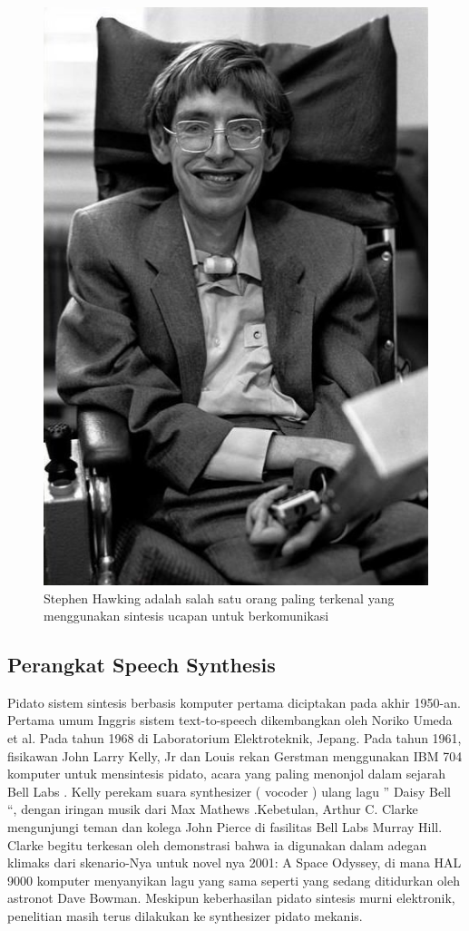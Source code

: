 \begin{figure}[H]
        \centerline{\includegraphics[scale=.45]{figures/stephan}}
        \caption{Stephen Hawking adalah salah satu orang paling terkenal yang menggunakan sintesis ucapan untuk berkomunikasi}
		\label{stephan}
\end{figure}

\subsection{Perangkat Speech Synthesis}
Pidato sistem sintesis berbasis komputer pertama diciptakan pada akhir 1950-an. Pertama umum Inggris sistem text-to-speech dikembangkan oleh Noriko Umeda et al. Pada tahun 1968 di Laboratorium Elektroteknik, Jepang. Pada tahun 1961, fisikawan John Larry Kelly, Jr dan Louis rekan Gerstman menggunakan IBM 704 komputer untuk mensintesis pidato, acara yang paling menonjol dalam sejarah Bell Labs . Kelly perekam suara synthesizer ( vocoder ) ulang lagu ” Daisy Bell “, dengan iringan musik dari Max Mathews .Kebetulan, Arthur C. Clarke mengunjungi teman dan kolega John Pierce di fasilitas Bell Labs Murray Hill. Clarke begitu terkesan oleh demonstrasi bahwa ia digunakan dalam adegan klimaks dari skenario-Nya untuk novel nya 2001: A Space Odyssey, di mana HAL 9000 komputer menyanyikan lagu yang sama seperti yang sedang ditidurkan oleh astronot Dave Bowman. Meskipun keberhasilan pidato sintesis murni elektronik, penelitian masih terus dilakukan ke synthesizer pidato mekanis.


